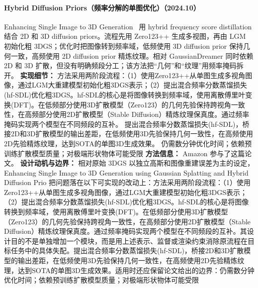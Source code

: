 \paragraph{Hybrid Diffusion Priors（频率分解的单图优化）（2024.10）}
Enhancing Single Image to 3D Generation~\cite{2410_09467} 用 hybrid frequency score distillation 结合 2D 和 3D diffusion priors。流程先用 Zero123++ 生成多视图，再由 LGM 初始化粗 3DGS；优化时把图像转到频率域，低频使用 3D diffusion prior 保持几何一致，高频使用 2D diffusion prior 精炼纹理。相对 GaussianDreamer 同时依赖 2D 和 3D 扩散，但没有明确频段分工；该方法把“几何”和“纹理”用频率掩码拆开。
\textbf{实现细节：} 方法采用两阶段流程：（1）使用Zero123++从单图生成多视角图像，通过LGM大重建模型初始化粗3DGS表示；（2）提出混合频率分数蒸馏损失(hf-SDL)优化粗3DGS。hf-SDL的核心是将图像转换到频率域，使用离散傅里叶变换(DFT)。在低频部分使用3D扩散模型（Zero123）的几何先验保持跨视角一致性，在高频部分使用2D扩散模型（Stable Diffusion）精炼纹理保真度。通过频率掩码实现两个模型在不同频段的互补。 提出混合频率分数蒸馏损失(hf-SDL)，桥接2D和3D扩散模型的输出差距，在低频使用3D先验保持几何一致性，在高频使用2D先验精炼纹理，达到SOTA的单图3D生成效果。 仍需数分钟优化时间；依赖预训练扩散模型质量；对极端形状物体可能受限
\textbf{方法信息：} Amazon 参与了这篇论文。
\textbf{设计动机与边界：} 相对原始 3DGS 以独立高斯和图像重建误差为主的设定，Enhancing Single Image to 3D Generation using Gaussian Splatting and Hybrid Diffusion Prio 把问题落在以下可实现的改动上：方法采用两阶段流程：（1）使用Zero123++从单图生成多视角图像，通过LGM大重建模型初始化粗3DGS表示；（2）提出混合频率分数蒸馏损失(hf-SDL)优化粗3DGS。hf-SDL的核心是将图像转换到频率域，使用离散傅里叶变换(DFT)。在低频部分使用3D扩散模型（Zero123）的几何先验保持跨视角一致性，在高频部分使用2D扩散模型（Stable Diffusion）精炼纹理保真度。通过频率掩码实现两个模型在不同频段的互补。其设计目的不是单独增加一个模块，而是用上述表示、监督或渲染约束消除原流程在目标任务中的具体失配。提出混合频率分数蒸馏损失(hf-SDL)，桥接2D和3D扩散模型的输出差距，在低频使用3D先验保持几何一致性，在高频使用2D先验精炼纹理，达到SOTA的单图3D生成效果。适用时还应保留论文给出的边界：仍需数分钟优化时间；依赖预训练扩散模型质量；对极端形状物体可能受限

